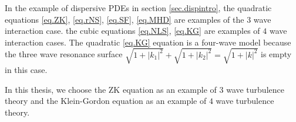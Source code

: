 In the example of dispersive PDEs in section \ref{sec.dispintro}, the quadratic equations \eqref{eq.ZK}, \eqref{eq.rNS}, \eqref{eq.SF}, \eqref{eq.MHD} are examples of the $3$ wave interaction case. the cubic equations \eqref{eq.NLS}, \eqref{eq.KG} are examples of $4$ wave interaction cases. The quadratic \eqref{eq.KG} equation is a four-wave model because the three wave resonance surface $\sqrt{1+|k_1|^2}+\sqrt{1+|k_2|^2}=\sqrt{1+|k|^2}$ is empty in this case.

In this thesis, we choose the ZK equation as an example of $3$ wave turbulence theory and the Klein-Gordon equation as an example of $4$ wave turbulence theory.  


